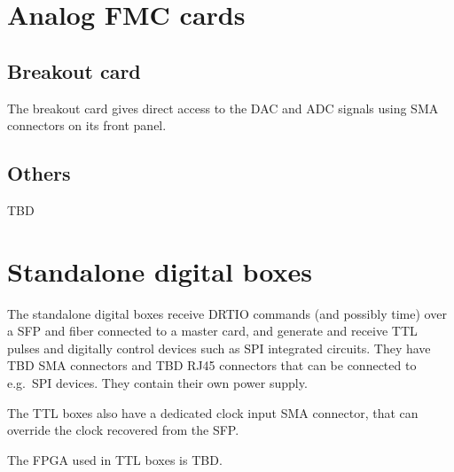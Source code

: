 \documentclass[11pt]{paper}
\begin{document}
\section{Analog FMC cards}
\subsection{Breakout card}
The breakout card gives direct access to the DAC and ADC signals using SMA connectors on its front panel.

\subsection{Others}
TBD

\section{Standalone digital boxes}
The standalone digital boxes receive DRTIO commands (and possibly time) over a SFP and fiber connected to a master card, and generate and receive TTL pulses and digitally control devices such as SPI integrated circuits. They have TBD SMA connectors and TBD RJ45 connectors that can be connected to e.g.\ SPI devices. They contain their own power supply.

The TTL boxes also have a dedicated clock input SMA connector, that can override the clock recovered from the SFP.

The FPGA used in TTL boxes is TBD.
\end{document}
